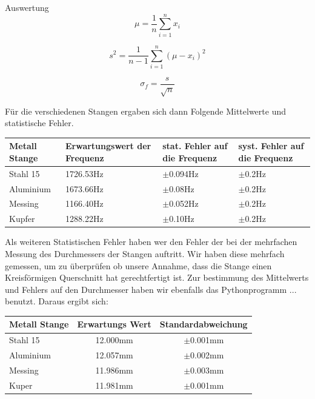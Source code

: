 \documentclass[twoside]{protokoll}
\begin{document}
\begin{aufgabe}{Auswertung}
\begin{equation}
	\mu = \frac{1}{n}\sum_{i=1}^nx_i
\end{equation}

\begin{equation}
	s^2 = \frac{1}{n-1}\sum_{i=1}^n(\mu-x_i)^2
\end{equation}

\begin{equation}
	\sigma_f = \frac{s}{\sqrt{n}} 
\end{equation}

Für die verschiedenen Stangen ergaben sich dann Folgende Mittelwerte und statistische Fehler.\\


 \begin{table}[H]
        \centering
        \begin{tabularx}{1\textwidth}{X X X X} %
            \toprule
            \textbf{Metall Stange} & \textbf{Erwartungswert der Frequenz} & \textbf{stat. Fehler auf die Frequenz} & \textbf{syst. Fehler auf die Frequenz} \\
            \midrule
            Stahl 15 & 1726.53Hz & $\pm$0.094Hz & $\pm$0.2Hz\\
            Aluminium & 1673.66Hz & $\pm$0.08Hz & $\pm$0.2Hz \\
            Messing & 1166.40Hz & $\pm$0.052Hz & $\pm$0.2Hz \\
            Kupfer & 1288.22Hz & $\pm$0.10Hz & $\pm$0.2Hz \\

            \bottomrule
        \end{tabularx}
        \label{tab:mytable}
    \end{table}
    
Als weiteren Statistischen Fehler haben wer den Fehler der bei der mehrfachen Messung des Durchmessers der Stangen auftritt.
Wir haben diese mehrfach gemessen, um zu überprüfen ob unsere Annahme, dass die Stange einen 
Kreisförmigen Querschnitt hat gerechtfertigt ist. Zur bestimmung des Mittelwerts und Fehlers auf den Durchmesser 
haben wir ebenfalls das Pythonprogramm ... benutzt. 
Daraus ergibt sich:\\

 \begin{table}[H]
        \centering
        \begin{tabularx}{0.8\textwidth}{X c c} %
            \toprule
            \textbf{Metall Stange} & \textbf{Erwartungs Wert} & \textbf{Standardabweichung} \\
            \midrule
            Stahl 15 & 12.000mm & $\pm$0.001mm \\
            Aluminium & 12.057mm & $\pm$0.002mm  \\
            Messing & 11.986mm & $\pm$0.003mm \\
            Kuper & 11.981mm & $\pm$0.001mm \\
            \bottomrule
        \end{tabularx}
        \label{tab:mytable}
    \end{table}


\end{aufgabe}
\end{document}
